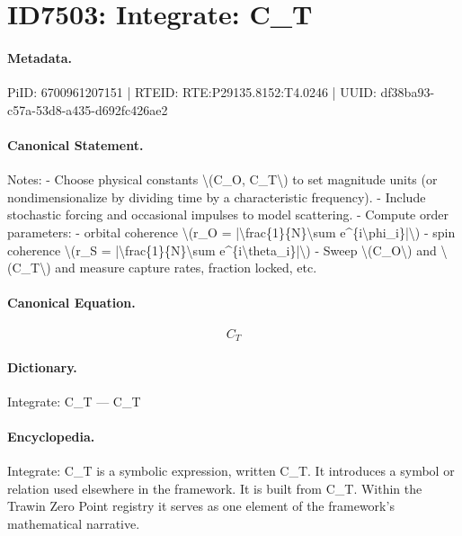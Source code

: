 \section*{ID7503: Integrate: C\_T}
\paragraph{Metadata.}
PiID: 6700961207151 | RTEID: RTE:P29135.8152:T4.0246 | UUID: df38ba93-c57a-53d8-a435-d692fc426ae2

\paragraph{Canonical Statement.}
Notes: - Choose physical constants \textbackslash{}(C\_O, C\_T\textbackslash{}) to set magnitude units (or nondimensionalize by dividing time by a characteristic frequency). - Include stochastic forcing and occasional impulses to model scattering. - Compute order parameters: - orbital coherence \textbackslash{}(r\_O = |\textbackslash{}frac\{1\}\{N\}\textbackslash{}sum e\textasciicircum{}\{i\textbackslash{}phi\_i\}|\textbackslash{}) - spin coherence \textbackslash{}(r\_S = |\textbackslash{}frac\{1\}\{N\}\textbackslash{}sum e\textasciicircum{}\{i\textbackslash{}theta\_i\}|\textbackslash{}) - Sweep \textbackslash{}(C\_O\textbackslash{}) and \textbackslash{}(C\_T\textbackslash{}) and measure capture rates, fraction locked, etc.

\paragraph{Canonical Equation.}
\[
C_T
\]

\paragraph{Dictionary.}
Integrate: C\_T — C\_T

\paragraph{Encyclopedia.}
Integrate: C\_T is a symbolic expression, written C\_T. It introduces a symbol or relation used elsewhere in the framework. It is built from C\_T. Within the Trawin Zero Point registry it serves as one element of the framework's mathematical narrative.
